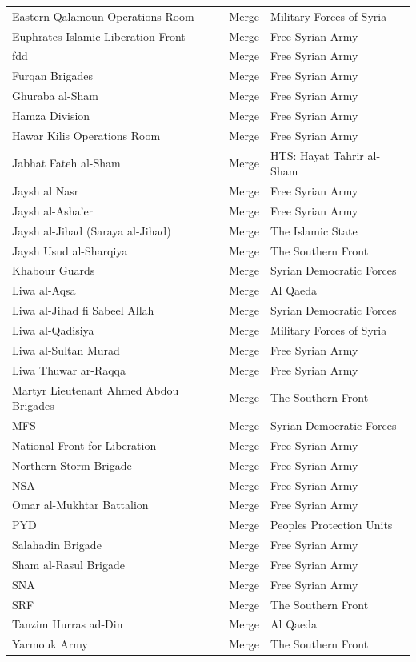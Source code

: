 \begin{longtable}{p{6.4cm} l p{6.0cm}}
Eastern Qalamoun Operations Room & Merge & Military Forces of Syria \\
Euphrates Islamic Liberation Front & Merge & Free Syrian Army \\
fdd & Merge & Free Syrian Army \\
Furqan Brigades & Merge & Free Syrian Army \\
Ghuraba al-Sham & Merge & Free Syrian Army \\
Hamza Division & Merge & Free Syrian Army \\
Hawar Kilis Operations Room & Merge & Free Syrian Army \\
Jabhat Fateh al-Sham & Merge & HTS: Hayat Tahrir al-Sham \\
Jaysh al Nasr & Merge & Free Syrian Army \\
Jaysh al-Asha'er & Merge & Free Syrian Army \\
Jaysh al-Jihad (Saraya al-Jihad) & Merge & The Islamic State \\
Jaysh Usud al-Sharqiya & Merge & The Southern Front \\
Khabour Guards & Merge & Syrian Democratic Forces \\
Liwa al-Aqsa & Merge & Al Qaeda \\
Liwa al-Jihad fi Sabeel Allah & Merge & Syrian Democratic Forces \\
Liwa al-Qadisiya & Merge & Military Forces of Syria \\
Liwa al-Sultan Murad & Merge & Free Syrian Army \\
Liwa Thuwar ar-Raqqa & Merge & Free Syrian Army \\
Martyr Lieutenant Ahmed Abdou Brigades & Merge & The Southern Front \\
MFS & Merge & Syrian Democratic Forces \\
National Front for Liberation & Merge & Free Syrian Army \\
Northern Storm Brigade & Merge & Free Syrian Army \\
NSA & Merge & Free Syrian Army \\
Omar al-Mukhtar Battalion & Merge & Free Syrian Army \\
PYD & Merge & Peoples Protection Units \\
Salahadin Brigade & Merge & Free Syrian Army \\
Sham al-Rasul Brigade & Merge & Free Syrian Army \\
SNA & Merge & Free Syrian Army \\
SRF & Merge & The Southern Front \\
Tanzim Hurras ad-Din & Merge & Al Qaeda \\
Yarmouk Army & Merge & The Southern Front \\
\end{longtable}


